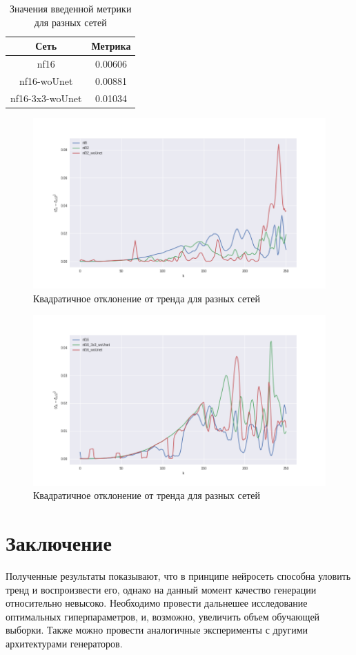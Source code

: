\documentclass[a4paper]{article}
\begin{document}
			\begin{table}[h]
				\begin{center}
					\begin{tabular}{|c|c|}
						\hline
						Сеть & Метрика \\
						\hline
						nf16 & 0.00606\\
						\hline
						nf16-woUnet & 0.00881\\
						\hline
						nf16-3x3-woUnet & 0.01034\\
						\hline
					\end{tabular}
					\caption{Значения введенной метрики для разных сетей}
				\end{center}
			\end{table}
			\begin{center}
				\begin{figure}[h]
					\includegraphics[width=0.95\linewidth,height=0.5\textwidth]{earr_1}
					\caption{Квадратичное отклонение от тренда для разных сетей}
				\end{figure}
				\begin{figure}[h]
					\includegraphics[width=0.95\linewidth,height=0.5\textwidth]{earr_2}
					\caption{Квадратичное отклонение от тренда для разных сетей}
					\end{figure}
			\end{center}
	\section{Заключение}
		Полученные результаты показывают, что в принципе нейросеть способна уловить тренд и воспроизвести его, однако на данный момент качество генерации относительно невысоко. Необходимо провести дальнешее исследование оптимальных гиперпараметров, и, возможно, увеличить объем обучающей выборки. Также можно провести аналогичные эксперименты с другими архитектурами генераторов.
\end{document}
